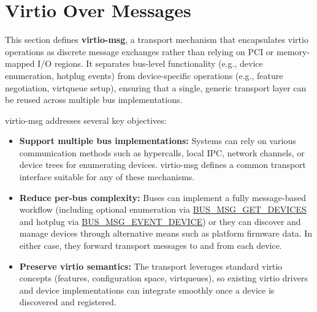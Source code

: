 \section{Virtio Over Messages}\label{sec:Virtio Transport Options / Virtio Over Messages}

\newcommand{\conceptref}[1]{\hyperref[sec:Virtio Transport Options / Virtio Over Messages / Basic Concepts / #1]{#1}}
\newcommand{\msgref}[1]{\hyperref[sec:Virtio Transport Options / Virtio Over Messages / Transport Messages / VIRTIO_MSG_#1]{VIRTIO_MSG_#1}}
\newcommand{\busref}[1]{\hyperref[sec:Virtio Transport Options / Virtio Over Messages / Bus Messages / BUS_MSG_#1]{BUS_MSG_#1}}
\newcommand{\msgdef}[1]{\subsubsection{VIRTIO_MSG_#1}\label{sec:Virtio Transport Options / Virtio Over Messages / Transport Messages / VIRTIO_MSG_#1}}
\newcommand{\busdef}[1]{\subsubsection{BUS_MSG_#1}\label{sec:Virtio Transport Options / Virtio Over Messages / Bus Messages / BUS_MSG_#1}}

This section defines \textbf{virtio-msg}, a transport mechanism that encapsulates
virtio operations as discrete message exchanges rather than relying on PCI or
memory-mapped I/O regions. It separates bus-level functionality (e.g., device
enumeration, hotplug events) from device-specific operations (e.g., feature
negotiation, virtqueue setup), ensuring that a single, generic transport layer
can be reused across multiple bus implementations.

virtio-msg addresses several key objectives:

\begin{itemize}
  \item \textbf{Support multiple bus implementations:}
  Systems can rely on various communication methods such as hypercalls, local
  IPC, network channels, or device trees for enumerating devices. virtio-msg
  defines a common transport interface suitable for any of these mechanisms.

  \item \textbf{Reduce per-bus complexity:}
  Buses can implement a fully message-based workflow (including optional
  enumeration via \busref{GET_DEVICES} and hotplug via \busref{EVENT_DEVICE})
  or they can discover and manage devices through
  alternative means such as platform firmware data. In either case, they
  forward transport messages to and from each device.

  \item \textbf{Preserve virtio semantics:}
  The transport leverages standard virtio concepts (features, configuration
  space, virtqueues), so existing virtio drivers and device implementations can
  integrate smoothly once a device is discovered and registered.
\end{itemize}

